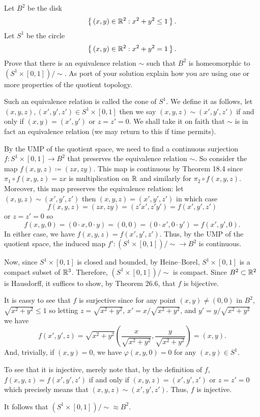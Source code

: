 \begin{problem}
Let $B^2$ be the disk
\[
\left\{\,(x,y)\in\mathbb{R}^2:x^2+y^2\leq 1\,\right\}.
\]
Let $S^1$ be the circle
\[
\left\{\,(x,y)\in\mathbb{R}^2:x^2+y^2=1\,\right\}.
\]
Prove that there is an equivalence relation $\sim$ such that $B^2$ is
homeomorphic to $(S^1\times[0,1])/{\sim}$. As port of your solution explain
how you are using one or more properties of the quotient topology.
\end{problem}
\begin{solution}
Such an equivalence relation is called the cone of $S^1$. We define it as
follows, let $(x,y,z),(x',y',z')\in S^1\times[0,1]$ then we say
$(x,y,z)\sim(x',y',z')$ if and only if $(x,y)=(x',y')$ or $z=z'=0$. We
shall take it on faith that $\sim$ is in fact an equivalence relation (we
may return to this if time permits).

By the UMP of the quotient space, we need to find a continuous surjection
$f\colon S^1\times[0,1]\to B^2$ that preserves the equivalence relation
$\sim$. So consider the map $f(x,y,z)\coloneq(zx,zy)$. This map is
continuous by Theorem 18.4 since $\pi_1\circ f(x,y,z)=zx$ is multiplication
on $\mathbb{R}$ and similarly for $\pi_2\circ f(x,y,z)$. Moreover, this map
preserves the equivalence relation: let $(x,y,z)\sim(x',y',z')$ then
$(x,y,z)=(x',y',z')$ in which case
\[
f(x,y,z)=(zx,zy)=(z'x',z'y')=f(x',y',z')
\]
or $z=z'=0$ so
\[
f(x,y,0)=(0\cdot x,0\cdot y)=(0,0)=(0\cdot x',0\cdot y')=f(x',y',0).
\]
In either case, we have $f(x,y,z)=f(x',y',z')$. Thus, by the UMP of the
quotient space, the induced map $f'\colon (S^1\times[0,1])/{\sim}\to B^2$
is continuous.

Now, since $S^1\times[0,1]$ is closed and bounded, by Heine--Borel,
$S^1\times[0,1]$ is a compact subset of $\mathbb{R}^3$. Therefore,
$(S^1\times[0,1])/{\sim}$ is compact. Since $B^2\subset\mathbb{R}^2$ is
Hausdorff, it suffices to show, by Theorem 26.6, that $f$ is bijective.

It is eassy to see that $f$ is surjective since for any point
$(x,y)\neq(0,0)$ in $B^2$, $\sqrt{x^2+y^2}\leq 1$ so letting
$z=\sqrt{x^2+y^2}$, $x'=x/\sqrt{x^2+y^2}$, and $y'=y/\sqrt{x^2+y^2}$ we
have
\[
f(x',y',z)=\sqrt{x^2+y^2}
\left(\frac{x}{\sqrt{x^2+y^2}},
\frac{y}{\sqrt{x^2+y^2}}\right)=(x,y).
\]
And, trivially, if $(x,y)=0$, we have $\varphi(x,y,0)=0$ for any $(x,y)\in
S^1$.

To see that it is injective, merely note that, by the definition of $f$,
$f(x,y,z)=f(x',y',z')$ if and only if $(x,y,z)=(x',y',z')$ or $z=z'=0$
which precisely means that $(x,y,z)\sim(x',y',z')$. Thus, $f$ is
injective.

It follows that $(S^1\times[0,1])/{\sim}\approx B^2$.
\end{solution}

